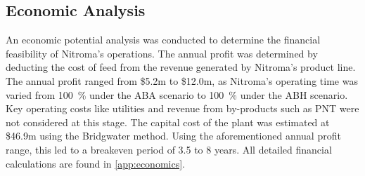 \subsection{Economic Analysis}
An economic potential analysis was conducted to determine the financial feasibility of Nitroma’s operations. The annual profit was determined by deducting the cost of feed from the revenue generated by Nitroma's product line. The annual profit ranged from \$5.2m to \$12.0m, as Nitroma's operating time was varied from \SI{100}{\percent} under the ABA scenario to \SI{100}{\percent} under the ABH scenario. Key operating costs like utilities and revenue from by-products such as PNT were not considered at this stage. The capital cost of the plant was estimated at \$46.9m using the Bridgwater method. Using the aforementioned annual profit range, this led to a breakeven period of 3.5 to 8 years. All detailed financial calculations are found in \cref{app:economics}.